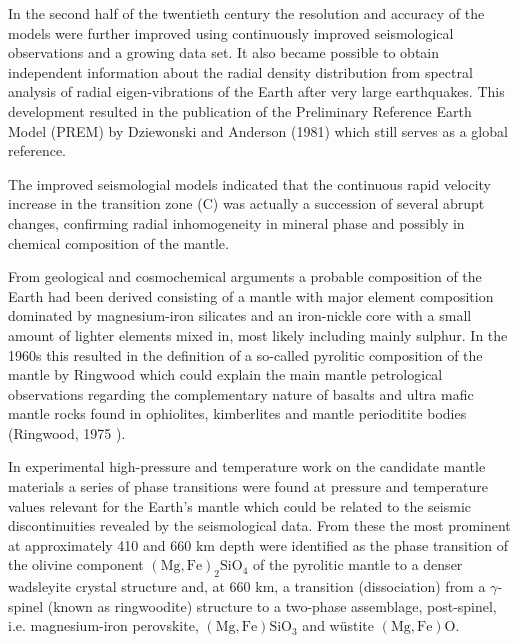 In the second half of the twentieth century the resolution and 
accuracy of the models were further improved using 
continuously improved seismological observations and a growing 
data set.
It also became possible to obtain independent information about
the radial density distribution from spectral analysis of 
radial eigen-vibrations of the Earth after very large earthquakes.
This development resulted in the publication of the 
Preliminary Reference Earth Model (PREM) by Dziewonski and Anderson (1981) \cite{dzan81}
which still serves as a global reference.


The improved seismologial models indicated
that the continuous rapid velocity increase in the transition zone (C) 
was actually a succession of several abrupt changes,
confirming radial inhomogeneity in mineral phase and possibly in 
chemical composition of the mantle.
 
From geological and cosmochemical arguments a probable composition of 
the Earth had been derived consisting of a mantle with major element
composition dominated by magnesium-iron silicates and an iron-nickle
core with a small amount of lighter elements mixed in,
most likely including mainly sulphur. 
In the 1960s this resulted in the definition of a so-called
pyrolitic composition of the mantle by Ringwood
which could explain the main
mantle petrological observations regarding the complementary
nature of basalts and ultra mafic mantle rocks found in ophiolites, 
kimberlites and mantle perioditite bodies
(Ringwood, 1975 \cite{ring75}). 

In experimental high-pressure and temperature work on the 
candidate mantle materials a series of phase transitions were found
at pressure and temperature values relevant for the Earth's mantle
which could be related to the seismic discontinuities 
revealed by the seismological data.
From these the most prominent at approximately 410 and 660 km depth 
were identified as the phase transition of the olivine component 
$\mathrm{(Mg,Fe)_2 SiO_4}$
of the pyrolitic mantle
to a denser wadsleyite crystal structure and,
at 660 km, a transition (dissociation) from a $\gamma$-spinel 
(known as ringwoodite) structure to a two-phase assemblage, 
post-spinel, i.e.
magnesium-iron perovskite, 
$\mathrm{(Mg,Fe)SiO_3}$ and w\"{u}stite $\mathrm{(Mg,Fe)O}$. 

